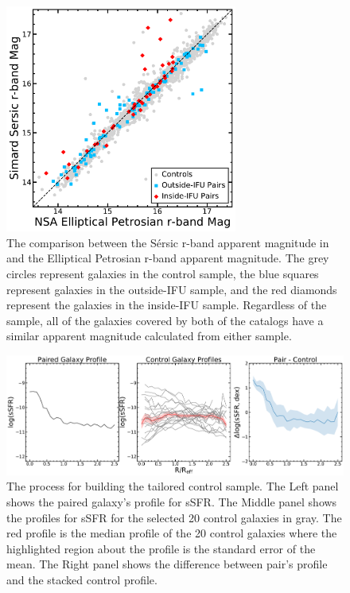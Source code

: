 \documentclass[iop,revtex4,twocolumn,apj,numberedappendix,appendixfloats]{emulateapj}
\begin{document}
\begin{figure}
\centering
\includegraphics[width=3in]{fig/mag_comp.pdf}
\caption[The comparison between the r-band magnitudes in Simard+11 and NSA catalog]{The comparison between the S\'ersic r-band apparent magnitude in \citet{Simard:2011} and the Elliptical Petrosian r-band apparent magnitude. The grey circles represent galaxies in the control sample, the blue squares represent galaxies in the outside-IFU sample, and the red diamonds represent the galaxies in the inside-IFU sample. Regardless of the sample, all of the galaxies covered by both of the catalogs have a similar apparent magnitude calculated from either sample.}
\label{fig:mag_comp}
\end{figure}

\begin{figure}
\centering
\includegraphics[width=\linewidth]{fig/8083-12703.pdf}
\caption[Example of the difference profiles for the mass-redshift selected control sample.]{The process for building the tailored control sample. The Left panel shows the paired galaxy's profile for sSFR. The Middle panel shows the profiles for sSFR for the selected 20 control galaxies in gray. The red profile is the median profile of the 20 control galaxies where the highlighted region about the profile is the standard error of the mean. The Right panel shows the difference between pair's profile and the stacked control profile.}
\label{fig:dex}
\end{figure}
\end{document}
